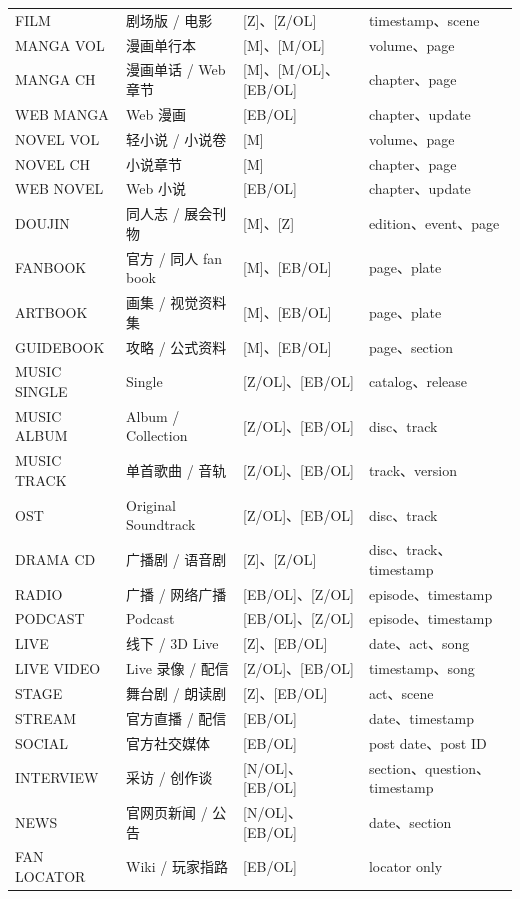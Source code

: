 \documentclass[profile=editorial,titlelayout=\AtelierSpecimenTitleLayout]{atelier}
\begin{document}
\begin{longtable}{@{}p{31mm}p{37mm}p{42mm}p{45mm}@{}}
FILM & 剧场版 / 电影 & [Z]、[Z/OL] & timestamp、scene \\
MANGA VOL & 漫画单行本 & [M]、[M/OL] & volume、page \\
MANGA CH & 漫画单话 / Web 章节 & [M]、[M/OL]、[EB/OL] & chapter、page \\
WEB MANGA & Web 漫画 & [EB/OL] & chapter、update \\
NOVEL VOL & 轻小说 / 小说卷 & [M] & volume、page \\
NOVEL CH & 小说章节 & [M] & chapter、page \\
WEB NOVEL & Web 小说 & [EB/OL] & chapter、update \\
DOUJIN & 同人志 / 展会刊物 & [M]、[Z] & edition、event、page \\
FANBOOK & 官方 / 同人 fan book & [M]、[EB/OL] & page、plate \\
ARTBOOK & 画集 / 视觉资料集 & [M]、[EB/OL] & page、plate \\
GUIDEBOOK & 攻略 / 公式资料 & [M]、[EB/OL] & page、section \\
MUSIC SINGLE & Single & [Z/OL]、[EB/OL] & catalog、release \\
MUSIC ALBUM & Album / Collection & [Z/OL]、[EB/OL] & disc、track \\
MUSIC TRACK & 单首歌曲 / 音轨 & [Z/OL]、[EB/OL] & track、version \\
OST & Original Soundtrack & [Z/OL]、[EB/OL] & disc、track \\
DRAMA CD & 广播剧 / 语音剧 & [Z]、[Z/OL] & disc、track、timestamp \\
RADIO & 广播 / 网络广播 & [EB/OL]、[Z/OL] & episode、timestamp \\
PODCAST & Podcast & [EB/OL]、[Z/OL] & episode、timestamp \\
LIVE & 线下 / 3D Live & [Z]、[EB/OL] & date、act、song \\
LIVE VIDEO & Live 录像 / 配信 & [Z/OL]、[EB/OL] & timestamp、song \\
STAGE & 舞台剧 / 朗读剧 & [Z]、[EB/OL] & act、scene \\
STREAM & 官方直播 / 配信 & [EB/OL] & date、timestamp \\
SOCIAL & 官方社交媒体 & [EB/OL] & post date、post ID \\
INTERVIEW & 采访 / 创作谈 & [N/OL]、[EB/OL] & section、question、timestamp \\
NEWS & 官网页新闻 / 公告 & [N/OL]、[EB/OL] & date、section \\
FAN LOCATOR & Wiki / 玩家指路 & [EB/OL] & locator only \\

\end{longtable}
\end{document}

